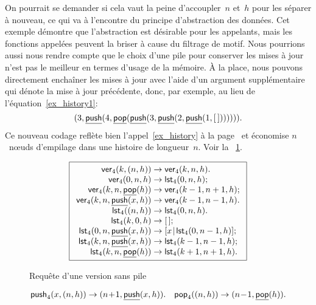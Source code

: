 On pourrait se demander si cela vaut la peine d'accoupler~\(n\)
et~\(h\) pour les séparer à nouveau, ce qui va à l'encontre du
principe d'abstraction des données. Cet exemple démontre que
l'abstraction est désirable pour les appelants, mais les fonctions
appelées peuvent la briser à cause du filtrage de motif. Nous
pourrions aussi nous rendre compte que le choix d'une pile pour
conserver les mises à jour n'est pas le meilleur en termes d'usage de
la mémoire. À la place, nous pouvons directement enchaîner les mises à
jour avec l'aide d'un argument supplémentaire qui dénote la mise à
jour précédente, donc, par exemple, au lieu de
l'équation~\eqref{ex_history1}:
\begin{equation*}
({3},{\underline{\textsf{push}}(4, \underline{\textsf{pop}}(\underline{\textsf{push}}(3, \underline{\textsf{push}}(2, \underline{\textsf{push}}(1,[\,])))))}).
\end{equation*}
Ce nouveau codage reflète
bien l'appel~\eqref{ex_history} à la page~\pageref{ex_history} et
économise \(n\)~n{\oe}uds d'empilage dans une histoire de
longueur~\(n\). Voir la \fig~\ref{fig:ver}.
\begin{figure}
\begin{equation*}
\boxed{%
\begin{array}{r@{\;}l@{\;}l}
\fun{ver}_4(k,\pair{n}{h}) & \rightarrow & \fun{ver}_4(k,n,h).\\
\fun{ver}_4(0,n,h) & \rightarrow & \fun{lst}_4(0,n,h);\\
\fun{ver}_4(k,n,\ufun{pop}(h))
                      & \rightarrow & \fun{ver}_4(k-1,n+1,h);\\
\fun{ver}_4(k,n,\ufun{push}(x,h))
                      & \rightarrow & \fun{ver}_4(k-1,n-1,h).\\
\fun{lst}_4(\pair{n}{h}) & \rightarrow & \fun{lst}_4(0,n,h).\\
\fun{lst}_4(k,0,h) & \rightarrow & \el;\\
\fun{lst}_4(0,n,\ufun{push}(x,h)) & \rightarrow
                      & \cons{x}{\fun{lst}_4(0,n-1,h)};\\
\fun{lst}_4(k,n,\ufun{push}(x,h)) & \rightarrow
                      & \fun{lst}_4(k-1,n-1,h);\\
\fun{lst}_4(k,n,\ufun{pop}(h)) & \rightarrow
                      & \fun{lst}_4(k+1,n+1,h).
\end{array}}
\end{equation*}
\caption{Requête d'une version sans pile}
\label{fig:ver}
\end{figure}
\begin{equation*}
\textsf{push}_4(x,({n},{h})) \rightarrow
({n\!+\!1},{\underline{\textsf{push}}(x,h)}).\quad
\textsf{pop}_4(({n},{h})) \rightarrow ({n\!-\!1},{\underline{\textsf{pop}}(h)}).
\end{equation*}

